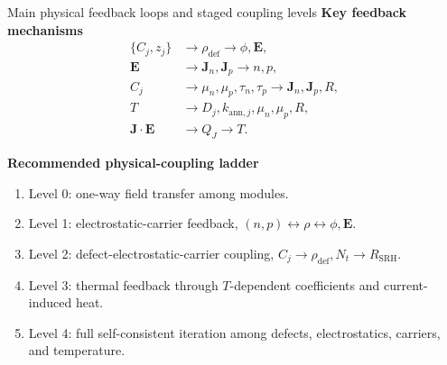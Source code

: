 \documentclass[aspectratio=169,10pt]{beamer}
\begin{document}
\begin{frame}{Main physical feedback loops and staged coupling levels}
\footnotesize
\textbf{Key feedback mechanisms}
\vspace{-0.25em}
\begin{align*}
\{C_j,z_j\}&\rightarrow \rho_{\mathrm{def}}\rightarrow \phi,\mathbf E,\\[-0.15em]
\mathbf E&\rightarrow \mathbf J_n,\mathbf J_p\rightarrow n,p,\\[-0.15em]
C_j&\rightarrow \mu_n,\mu_p,\tau_n,\tau_p\rightarrow \mathbf J_n,\mathbf J_p,R,\\[-0.15em]
T&\rightarrow D_j,k_{\mathrm{ann},j},\mu_n,\mu_p,R,\\[-0.15em]
\mathbf J\cdot\mathbf E&\rightarrow Q_J\rightarrow T.
\end{align*}

\vspace{-0.3em}
\textbf{Recommended physical-coupling ladder}
\vspace{-0.25em}
\begin{enumerate}
    \item Level 0: one-way field transfer among modules.
    \item Level 1: electrostatic-carrier feedback, $(n,p)\leftrightarrow \rho\leftrightarrow\phi,\mathbf E$.
    \item Level 2: defect-electrostatic-carrier coupling, $C_j\rightarrow\rho_{\mathrm{def}},N_t\rightarrow R_{\mathrm{SRH}}$.
    \item Level 3: thermal feedback through $T$-dependent coefficients and current-induced heat.
    \item Level 4: full self-consistent iteration among defects, electrostatics, carriers, and temperature.
\end{enumerate}
\end{frame}
\end{document}
